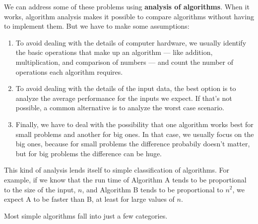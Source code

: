 \documentclass[12pt]{book}
\theoremstyle{exercise}
\newcommand{\java}{\verb}%}
\begin{document}
We can address some of these problems using {\bf analysis of
  algorithms}. When it works, algorithm analysis makes it possible to
compare algorithms without having to implement them. But we have to
make some assumptions:

\begin{enumerate}

\item To avoid dealing with the details of computer hardware, we
  usually identify the basic operations that make up an algorithm ---
  like addition, multiplication, and comparison of numbers --- and
  count the number of operations each algorithm requires.

\item To avoid dealing with the details of the input data, the best
  option is to analyze the average performance for the inputs we
  expect. If that's not possible, a common alternative is to analyze
  the worst case scenario.

\item Finally, we have to deal with the possibility that one algorithm
  works best for small problems and another for big ones. In that
  case, we usually focus on the big ones, because for small problems
  the difference probabily doesn't matter, but for big problems the
  difference can be huge.

\end{enumerate}

This kind of analysis lends itself to simple classification of
algorithms. For example, if we know that the run time of Algorithm A
tends to be proportional to the size of the input, $n$, and Algorithm
B tends to be proportional to $n^2$, we expect A to be faster than B,
at least for large values of $n$.

Most simple algorithms fall into just a few categories.

\end{document}
